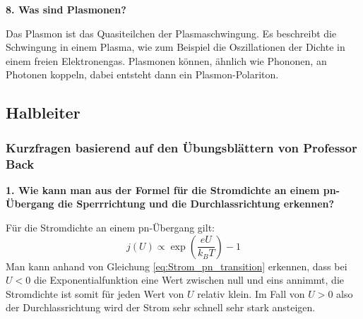 \noindent\textbf{8. Was sind Plasmonen?}\\
\begin{addmargin}[25pt]{0pt}
Das Plasmon ist das Quasiteilchen der Plasmaschwingung. Es beschreibt die Schwingung in einem Plasma, wie zum Beispiel die Oszillationen der Dichte in einem freien Elektronengas. Plasmonen können, ähnlich wie Phononen, an Photonen koppeln, dabei entsteht dann ein Plasmon-Polariton. \\
\end{addmargin}



\subsection{Halbleiter}
\subsubsection{Kurzfragen basierend auf den Übungsblättern von Professor Back}
\noindent\textbf{1. Wie kann man aus der Formel für die Stromdichte an einem pn-Übergang die Sperrrichtung und die Durchlassrichtung erkennen?}\\
\begin{addmargin}[25pt]{0pt}
 Für die Stromdichte an einem pn-Übergang gilt:
 \begin{equation}\label{eq:Strom_pn_transition}
      j(U) \propto \exp(\frac{eU}{k_BT}) -1
 \end{equation}
 Man kann anhand von Gleichung \ref{eq:Strom_pn_transition} erkennen, dass bei $U<0$ die Exponentialfunktion eine Wert zwischen null und eins annimmt, die Stromdichte ist somit für jeden Wert von $U$ relativ klein. Im Fall von $U>0$ also der Durchlassrichtung wird der Strom sehr schnell sehr stark ansteigen.   
 \end{addmargin}


